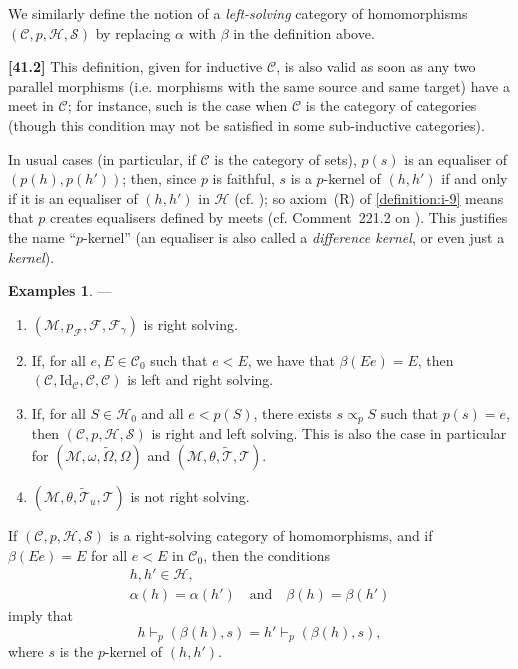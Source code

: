 \documentclass[a4paper,fleqn]{article}
\theoremstyle{plain}
\newenvironment{proposition}[1]
  {\renewcommand\theinnerproposition{#1}\innerproposition}
  {\endinnerproposition}
\theoremstyle{definition}
\newtheorem*{examples}{Examples}
\newenvironment{longcomm}[1]
  {\noindent\textbf{[#1]}\rmfamily}
  {}
\newcommand{\oldpage}[1]{{\marginpar{\footnotesize$\bigg\vert$\,\,\,\,\textit{p.~#1}}}}
\newcommand{\textand}{\quad\text{and}\quad}
\newcommand{\CC}{\mathcal{C}}
\newcommand{\HH}{\mathcal{H}}
\renewcommand{\SS}{\mathcal{S}}
\newcommand{\MM}{\mathcal{M}}
\newcommand{\FF}{\mathcal{F}}
\newcommand{\TT}{\mathcal{T}}
\newcommand{\tTT}{\widetilde{\TT}}
\newcommand{\subs}{\mathrel{\propto}}
\newcommand{\Id}{\mathrm{Id}}
\begin{document}
We similarly define the notion of a \emph{left-solving} category of homomorphisms $(\CC,p,\HH,\SS)$ by replacing $\alpha$ with $\beta$ in the definition above.

\begin{longcomm}{41.2}
  This definition, given for inductive $\CC$, is also valid as soon as any two parallel morphisms (i.e. morphisms with the same source and same target) have a meet in $\CC$;
  for instance, such is the case when $\CC$ is the category of categories (though this condition may not be satisfied in some sub-inductive categories).

  In usual cases (in particular, if $\CC$ is the category of sets), $p(s)$ is an equaliser of $(p(h),p(h'))$;
  then, since $p$ is faithful, $s$ is a $p$-kernel of $(h,h')$ if and only if it is an equaliser of $(h,h')$ in $\HH$ (cf. \cite[Proposition~3.1]{coll109});
  so axiom~(R) of \cref{definition:i-9} means that $p$ creates equalisers defined by meets (cf. Comment~221.2 on \cite{coll100}).
  This justifies the name ``$p$-kernel'' (an equaliser is also called a \emph{difference kernel}, or even just a \emph{kernel}).
\end{longcomm}

\begin{examples}
  ---
  \begin{enumerate}
    \item[\normalfont(1)]
      $(\MM,p_\FF,\FF,\FF_\gamma)$ is right solving.

    \item[\normalfont(2)]
      If, for all $e,E\in\CC_0$ such that $e<E$, we have that $\beta(Ee)=E$, then $(\CC,\Id_\CC,\CC,\CC)$ is left and right solving.

    \item[\normalfont(3)]
      If, for all $S\in\HH_0$ and all $e<p(S)$, there exists $s\subs_p S$ such that $p(s)=e$, then $(\CC,p,\HH,\SS)$ is right and left solving.
      This is also the case in particular for $(\MM,\omega,\widetilde{\Omega},\Omega)$ and $(\MM,\theta,\tTT,\TT)$.

    \item[\normalfont(4)]
      \oldpage{370}
      $(\MM,\theta,\tTT_u,\TT)$ is not right solving.
  \end{enumerate}
\end{examples}

\begin{proposition}{11}
\label{proposition:i-11}
  If $(\CC,p,\HH,\SS)$ is a right-solving category of homomorphisms, and if $\beta(Ee)=E$ for all $e<E$ in $\CC_0$, then the conditions
  \[
    \begin{gathered}
      h,h'\in\HH,
    \\\alpha(h)=\alpha(h')
      \textand
      \beta(h)=\beta(h')
    \end{gathered}
  \]
  imply that
  \[
    h\vdash_p(\beta(h),s)
    = h'\vdash_p(\beta(h),s),
  \]
  where $s$ is the $p$-kernel of $(h,h')$.
\end{proposition}
\end{document}
